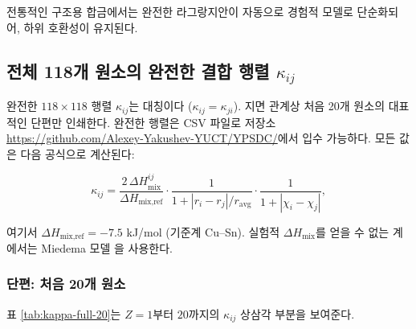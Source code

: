 \documentclass[12pt,a4paper]{article}
\begin{document}
	전통적인 구조용 합금에서는 완전한 라그랑지안이 자동으로 경험적 모델로 단순화되어, 하위 호환성이 유지된다.
	
	\subsection{전체 118개 원소의 완전한 결합 행렬 \(\kappa_{ij}\)}
	\label{subsec:full-kappa}
	
	완전한 \(118\times118\) 행렬 \(\kappa_{ij}\)는 대칭이다 (\(\kappa_{ij}=\kappa_{ji}\)). 지면 관계상 처음 20개 원소의 대표적인 단편만 인쇄한다. 완전한 행렬은 CSV 파일로 저장소 \url{https://github.com/Alexey-Yakushev-YUCT/YPSDC/}에서 입수 가능하다. 모든 값은 다음 공식으로 계산된다:
	
	\[
	\kappa_{ij} = \frac{2\,\Delta H_{\text{mix}}^{ij}}{\Delta H_{\text{mix,ref}}} \cdot
	\frac{1}{1 + |r_i - r_j|/r_{\text{avg}}} \cdot
	\frac{1}{1 + |\chi_i - \chi_j|},
	\]
	
	여기서 \(\Delta H_{\text{mix,ref}} = -7.5\) kJ/mol (기준계 Cu–Sn). 실험적 \(\Delta H_{\text{mix}}\)를 얻을 수 없는 계에서는 Miedema 모델 \cite{Miedema1980}을 사용한다.
	
	\subsubsection*{단편: 처음 20개 원소}
	표 \ref{tab:kappa-full-20}는 \(Z=1\)부터 \(20\)까지의 \(\kappa_{ij}\) 상삼각 부분을 보여준다.
	
\end{document}
